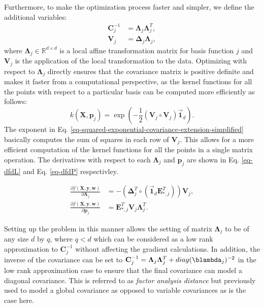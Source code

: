 \documentclass[useAMS,usenatbib,fleqn]{mn2e}
\begin{document}
Furthermore, to make the optimization process faster and simpler, we define the additional variables:
\begin{subequations}
\begin{align}
\label{eq-Cinv}
\mathbf{C}_{j}^{-1} &= \mathbf\Lambda_{j}\mathbf\Lambda_{j}^{T},\\
\label{eq-V_j}
\mathbf{V}_{j} &= \mathbf\Delta_{j}\mathbf\Lambda_{j},
\end{align}
\end{subequations}
where $\mathbf\Lambda_{j} \in \mathbb{R}^{d\times d}$ is a local affine transformation matrix for basis function $j$ and $\mathbf{V}_{j}$ is the application of the local transformation to the data. Optimizing with respect to $\mathbf\Lambda_{j}$ directly ensures that the covariance matrix is positive definite and makes it faster from a computational perspective, as the kernel functions for all the points with respect to a particular basis can be computed more efficiently as follows:
\begin{equation}
\label{eq-squared-exponential-covariance-extension-simplified}
k(\mathbf{X},\mathbf{p}_{j}) = \exp{\left(-\frac{1}{2}\left(\mathbf{V}_{j}\circ \mathbf{V}_{j}\right)\vec{\mathbf{1}}_{d}\right)}.
\end{equation}
The exponent in Eq. \eqref{eq-squared-exponential-covariance-extension-simplified} basically computes the sum of squares in each row of $\mathbf{V}_{j}$. This allows for a more efficient computation of the kernel functions for all the points in a single matrix operation. The derivatives with respect to each $\mathbf\Lambda_{j}$ and $\mathbf{p}_{j}$ are shown in Eq. \eqref{eq-dfdL} and Eq. \eqref{eq-dfdP} respectivley.

\begin{subequations}
\begin{align}
\label{eq-dfdL}
\frac{\partial f(\mathbf{X},\mathbf{y},\mathbf{w})}{\partial \mathbf\Lambda_{j}} &= -\left( \mathbf\Delta_{j}^{T}\circ \left(\vec{\mathbf{1}}_{d}\mathbf{E}_{*,j}^{T}\right) \right)\mathbf{V}_{j},\\
\label{eq-dfdP}
\frac{\partial f(\mathbf{X},\mathbf{y},\mathbf{w})}{\partial \mathbf{p}_{j}} &= \mathbf{E}_{*,j}^{T}\mathbf{V}_{j}\mathbf\Lambda_{j}^{T}.
\end{align}
\end{subequations}


Setting up the problem in this manner allows the setting of matrix $\mathbf\Lambda_{j}$ to be of any size $d$ by $q$, where $q<d$ which can be considered as a low rank approximation to $\mathbf{C}_{j}^{-1}$ without affecting the gradient calculations. In addition, the inverse of the covariance can be set to  $\mathbf{C}_{j}^{-1}=\mathbf\Lambda_{j}\mathbf\Lambda_{j}^{T}+diag(\blambda_{j})^{-2}$ in the low rank approximation case to ensure that the final covariance can model a diagonal covariance. This is referred to as \emph{factor analysis distance} \citep[p. 107]{rasmussen2006gaussian} but previously used to model a global covariance as opposed to variable covariances as is the case here.
\end{document}
